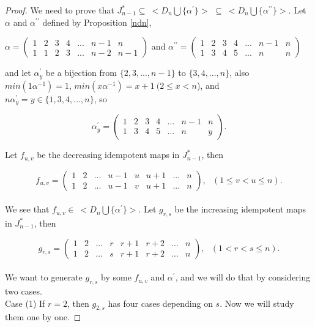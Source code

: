 \documentclass[10pt,a4paper]{amsart}
\begin{document}
\begin{proof}
  We need to prove that $J^*_{n-1}
  \subseteq \ <D_n \bigcup \{\alpha^\prime\}>$ $\subseteq \ <D_n \bigcup \{\alpha^{\prime\prime}\}>$. 
Let $\alpha$ and $\alpha^{\prime\prime}$ defined by Proposition \ref{ndn},

\vspace{0.2cm}
\begin{center}
$\alpha=
\begin{pmatrix}  
1&2&3&4&...&n-1&n\\1&1&2&3&...&n-2&n-1
\end{pmatrix}$ and
$\alpha^{\prime\prime}=
\begin{pmatrix}  
1&2&3&4&...&n-1&n\\1&3&4&5&...&n&n
\end{pmatrix}$\\[10pt]
\end{center}
and let $\alpha^{\prime}_y$ be a bijection from $\{2,3,...,n-1\}$ to $\{3,4,...,n\}$, also $min(1\alpha^{-1})=1$, $min(x\alpha^{-1})=x+1 \ (2\leq x <n$), and \ $n\alpha^{\prime}_y=y\in \{1,3,4,...,n\}$, so

\vspace{0.3cm}
$$\alpha^{\prime}_y=
\begin{pmatrix}  
1&2&3&4&...&n-1&n\\1&3&4&5&...&n&y
\end{pmatrix}.$$

\vspace{0.5cm}
Let $f_{u,v}$ be the decreasing idempotent maps in $J^*_{n-1}$, then

\vspace{0.2cm}
$$f_{u,v}=
\begin{pmatrix}  
1&2&...&u-1&u&u+1&...&n\\1&2&...&u-1&v&u+1&...&n
\end{pmatrix}, \ \ \ (1\leq v <u \leq n).$$\\[10pt]
We see that $f_{u,v} \in \ <D_n \bigcup \{\alpha^\prime\}>$. Let $g_{r,s}$ be the increasing idempotent maps in $J^*_{n-1}$, then

\vspace{0.2cm}
$$g_{r,s}=
\begin{pmatrix}  
1&2&...&r&r+1&r+2&...&n\\1&2&...&s&r+1&r+2&...&n
\end{pmatrix}, \ \ \ (1<r<s \leq n).$$\\[10pt]
We want to generate $g_{r,s}$ by some $f_{u,v}$ and $\alpha^{\prime}$,
and we will do that by considering two cases.\\[10pt]
Case (1) If $r=2$, then $g_{2,s}$ has four cases depending on $s$. Now we will study them one by one.


\end{proof}
\end{document}
